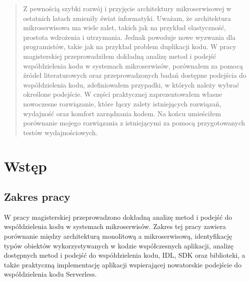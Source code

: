 \documentclass[runningheads,12pt]{llncs}
\begin{document}
\newpage

\begin{abstract}
Z pewnością szybki rozwój i przyjęcie architektury mikroserwisowej w ostatnich latach zmieniły świat informatyki. Uważam, że architektura mikroserwisowa ma wiele zalet, takich jak na przykład elastyczność, prostota wdrożenia i utrzymania. Jednak powoduje nowe wyzwania dla programistów, takie jak na przykład problem duplikacji kodu. W pracy magisterskiej przeprowadziłem dokładną analizę metod i podejść współdzielenia kodu w systemach mikroserwisów, porównałem za pomocą źródeł literaturowych oraz przeprowadzonych badań dostępne podejścia do współdzielenia kodu, zdefiniowałem przypadki, w których należy wybrać określone podejście. W części praktycznej zaprezentowałem własne nowoczesne rozwiązanie, które łączy zalety istniejących rozwiązań, wydajność oraz komfort zarządzania kodem. Na końcu umieściłem porównanie mojego rozwiązania z istniejącymi za pomocą przygotowanych testów wydajnościowych.
\end{abstract}

\newpage

\tableofcontents

\newpage

\section{Wstęp}

\subsection{Zakres pracy}
W pracy magisterskiej przeprowadzono dokładną analizę metod i podejść do współdzielenia kodu w systemach mikroserwisów. Zakres tej pracy zawiera porównanie między architekturą monolitową a mikroserwisową, identyfikację typów obiektów wykorzystywanych w kodzie współczesnych aplikacji, analizę dostępnych metod i podejść do współdzielenia kodu, IDL, SDK oraz biblioteki, a także praktyczną implementację aplikacji wspierającej nowatorskie podejście do współdzielenia kodu Serverless.
\end{document}
